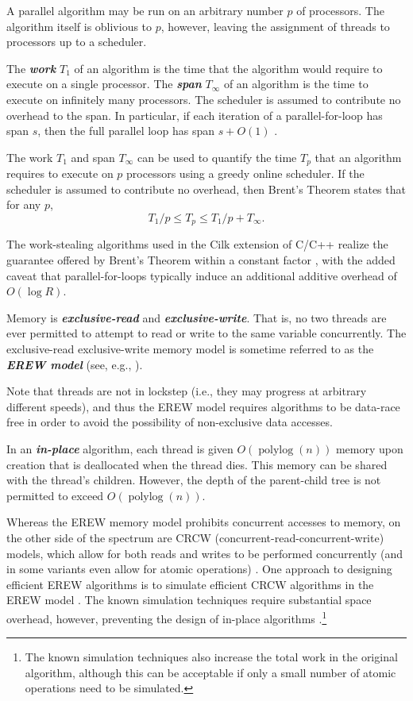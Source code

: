 \documentclass[11pt]{article}
\newcommand{\polylog}{\operatorname{polylog}}
\newcommand{\defn}[1]{{\textit{\textbf{\boldmath #1}}}}
\renewcommand{\paragraph}[1]{\vspace{0.09in}\noindent{\bf \boldmath #1.}}
\theoremstyle{remark}
\theoremstyle{remark}
\begin{document}
A parallel algorithm may be run on an arbitrary number $p$ of
processors. The algorithm itself is oblivious to $p$, however, leaving
the assignment of threads to processors up to a scheduler.

The \defn{work} $T_1$ of an algorithm is the time that the algorithm
would require to execute on a single processor. The \defn{span}
$T_\infty$ of an algorithm is the time to execute on infinitely many
processors. The scheduler is assumed to contribute no overhead to the
span. In particular, if each iteration of a
parallel-for-loop has span $s$, then the full parallel loop has span
$s + O(1)$ \cite{Blelloch96,AcarBl16}.

The work $T_1$ and span $T_\infty$ can be used to quantify the time $T_p$
that an algorithm requires to execute on $p$ processors using a greedy
online scheduler. If the scheduler is assumed to contribute no
overhead, then Brent's Theorem \cite{Brent74} states that for any
$p$,
$$T_1 / p \le T_p \le T_1 / p + T_\infty.$$

The work-stealing algorithms used in the Cilk extension of C/C++ realize
the guarantee offered by Brent's Theorem within a constant factor
\cite{BlumofeJo96,BlumofeLe99}, with the added caveat that parallel-for-loops
typically induce an additional additive overhead of $O(\log R)$. 

\paragraph{Memory Model} Memory is \defn{exclusive-read} and \defn{exclusive-write}. That is, no two threads are ever permitted to attempt to read or write to the same variable concurrently. 
The exclusive-read exclusive-write memory model is sometime referred
to as the \defn{EREW model} (see, e.g., \cite{Hagerup89}).

Note that threads are not in lockstep (i.e., they may progress at arbitrary
different speeds), and thus the EREW model requires algorithms to be data-race
free in order to avoid the possibility of non-exclusive data accesses.

In an \defn{in-place} algorithm, each thread is given $O(\polylog(n))$
memory upon creation that is deallocated when the thread dies. This
memory can be shared with the thread's children. However, the depth of
the parent-child tree is not permitted to exceed $O(\polylog(n))$.

Whereas the EREW memory model prohibits concurrent accesses to memory, on the
other side of the spectrum are CRCW (concurrent-read-concurrent-write) models,
which allow for both reads and writes to be performed concurrently (and in some
variants even allow for atomic operations)
\cite{Blelloch96,AcarBl16,MatiasVi95}. One approach to designing efficient EREW
algorithms is to simulate efficient CRCW algorithms in the EREW model
\cite{MatiasVi95}. The known simulation techniques require substantial space
overhead, however, preventing the design of in-place algorithms
\cite{MatiasVi95}.\footnote{The known simulation techniques also increase the
total work in the original algorithm, although this can be acceptable if only a
small number of atomic operations need to be simulated.}
\end{document}
